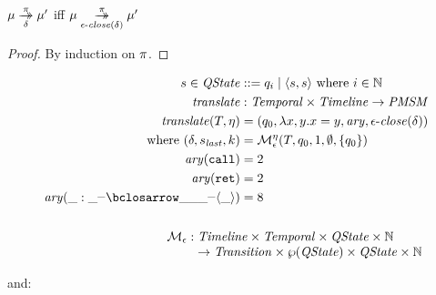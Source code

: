 \begin{lemma}
  $\mu \overset{\pi}{\underset{\delta}{\to\!\!\!\!\!\to}} \mu'$ iff
  $\mu \overset{\pi}{\underset{\epsilon\text{-}\mathit{close}(\delta)}{\to\!\!\!\!\!\to}} \mu'$
\end{lemma}
\begin{proof}
  By induction on $\pi$.
\end{proof}
%
\begin{align*}
 s \in \QState &::= q_i \alt \pmsmpair{s}{s} \text{ where } i \in \Nat
\\
 \translateeps &: \TContract \times \Timeline \to \PMSM
\\
 \translateeps(\mtcon, \mtimeline) &= (\pmsmq_0, \lambda x,y . x = y, \ary, \epsclose(\delta)) \\
 \text{where }
   (\delta, \pmsmqlast, k) &= \epshelp^\mtimeline(\mtcon, \pmsmq_0, 1, \emptyset, \setof{\pmsmq_0})
\\
   \ary(\apvcallalone) &= 2 \\
   \ary(\apvretalone) &= 2 \\
   \ary(\bclos{\swc}{\swc}{\swc}{\swc}{\swc}{\swc}{\swc}{\swc}) &= 8 \\
\\
\begin{array}{l}
    \epshelp :  \Timeline \times \TContract \times \QState \times \Nat \\ \phantom{\epshelp :}\to \mathit{Transition} \times \wp(\QState) \times \QState \times \Nat
\end{array}\span\omit
\end{align*}

and:

